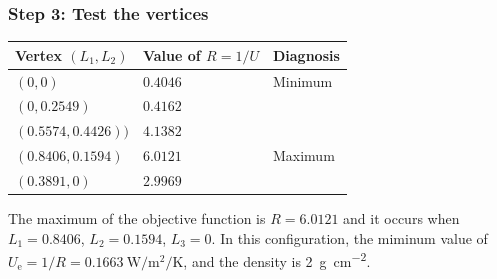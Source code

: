 \documentclass{article}
\begin{document}
\subsubsection*{Step 3: Test the vertices}

\begin{center}
\begin{tabular}{lll} \toprule
Vertex $(L_1,L_2)$ & Value of $R = 1/U$ & Diagnosis \\ \midrule
$(0,0)$ & $0.4046$ & Minimum \\
$(0,0.2549)$ & $0.4162$ & \\
$(0.5574,0.4426))$ & $4.1382$ & \\
$(0.8406,0.1594)$ & $6.0121$ & Maximum \\
$(0.3891,0)$ & $2.9969$ & \\ \bottomrule
\end{tabular}
\end{center}

The maximum of the objective function is $R=6.0121$ and it occurs when
$L_1 = 0.8406$, $L_2 = 0.1594$, $L_3 = 0$.  In this configuration,
the miminum value of $U_{\text{e}} = 1/R = \SI{0.1663}{\watt\per\meter\squared\per\kelvin}$,
and the density is \SI{2}{\gram\per\centi\meter\squared}.
\end{document}
